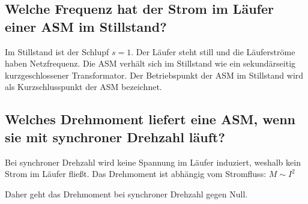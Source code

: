 \documentclass[conference]{IEEEtran}
\begin{document}
\subsection{Welche Frequenz hat der Strom im Läufer einer ASM im Stillstand?}

Im Stillstand ist der Schlupf $s=1$. Der Läufer steht still und die
Läuferströme haben Netzfrequenz. Die ASM verhält sich im Stillstand wie ein
sekundärseitig kurzgeschlossener Transformator. Der Betriebspunkt der ASM im
Stillstand wird als Kurzschlusspunkt der ASM bezeichnet.

\subsection{Welches Drehmoment liefert eine ASM, wenn sie mit synchroner
    Drehzahl läuft?}

Bei synchroner Drehzahl wird keine Spannung im Läufer induziert, weshalb kein
Strom im Läufer fließt. Das Drehmoment ist abhängig vom Stromfluss: $M \sim
    I^{2}$

Daher geht das Drehmoment bei synchroner Drehzahl gegen Null.
\end{document}

